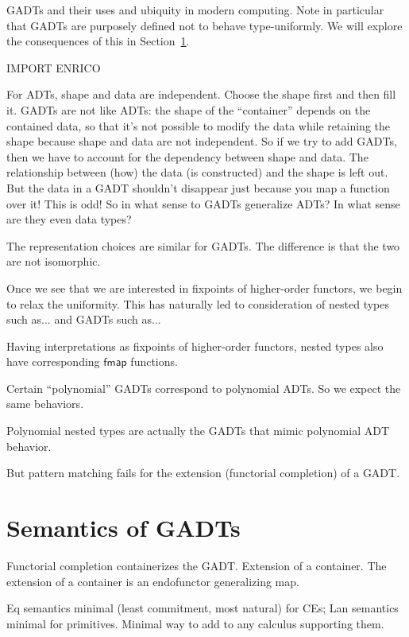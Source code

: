 \documentclass[acmsmall,screen,review,anonymous]{acmart}
\theoremstyle{definition}
\begin{document}
GADTs and their uses and ubiquity in modern computing. Note in
particular that GADTs are purposely defined not to behave
type-uniformly. We will explore the consequences of this in
Section~\ref{sec:GADT-semantics}.

IMPORT ENRICO




For ADTs, shape and data are independent. Choose the shape first and
then fill it. GADTs are not like ADTs: the shape of the ``container''
depends on the contained data, so that it's not possible to modify the
data while retaining the shape because shape and data are not
independent.  So if we try to add GADTs, then we have to account for
the dependency between shape and data. The relationship between (how)
the data (is constructed) and the shape is left out.  But the data in
a GADT shouldn't disappear just because you map a function over it!
This is odd! So in what sense to GADTs generalize ADTs? In what sense
are they even data types?



The representation choices are similar for GADTs. The difference is
that the two are not isomorphic.


Once we see that we are interested in fixpoints of higher-order
functors, we begin to relax the uniformity. This has naturally led to
consideration of nested types such as... and GADTs such as...

Having interpretations as fixpoints of higher-order functors, nested
types also have corresponding $\mathsf{fmap}$ functions.

Certain ``polynomial'' GADTs correspond to polynomial ADTs. So we
expect the same behaviors.

Polynomial nested types are actually the GADTs that mimic polynomial
ADT behavior.



But pattern matching fails for the extension (functorial completion)
of a GADT.

\section{Semantics of GADTs}\label{sec:GADT-semantics}

Functorial completion containerizes the GADT. Extension of a
container. The extension of a container is an endofunctor generalizing
map.


Eq semantics minimal (least commitment, most natural) for CEs; Lan
semantics minimal for primitives. Minimal way to add to any calculus
supporting them.
\end{document}
